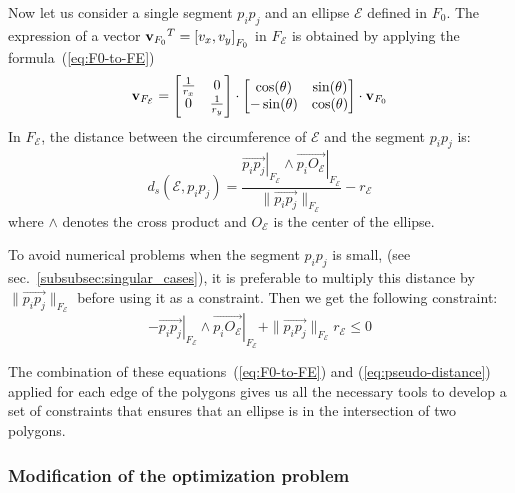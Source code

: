 Now let us consider a single segment $p_i p_j$ and an ellipse $\mathcal{E}$ defined in $F_0$.
The expression of a vector ${{\bf v}_{F_0}}^T = {[v_x, v_y]}_{F_0}$ in $F_\mathcal{E}$ is obtained by applying the formula~(\ref{eq:F0-to-FE})
\begin{equation}
{\bf v}_{F_\mathcal{E}} =
\begin{bmatrix}
\frac{1}{r_x} & 0 \\
0 & \frac{1}{r_y}
\end{bmatrix}
\cdot \begin{bmatrix}
\cos(\theta) & \sin(\theta) \\
-\sin(\theta) & \cos(\theta)
\end{bmatrix}
\cdot {\bf v}_{F_0}
\label{eq:F0-to-FE}
\end{equation}
In $F_\mathcal{E}$, the distance between the circumference of $\mathcal{E}$ and the segment $p_i p_j$ is:
\begin{equation}
	d_s(\mathcal{E}, p_i p_j) = \frac{{\left.\overrightarrow{p_i p_j}\right|}_{F_\mathcal{E}} \wedge {\left.\overrightarrow{p_i O_\mathcal{E}}\right|}_{F_\mathcal{E} } }{\| \overrightarrow{p_i p_j}\|_{F_\mathcal{E} } }-r_{\mathcal{E}}
\end{equation}
where $\wedge$ denotes the cross product and $O_{\mathcal{E}}$ is the center of the ellipse.

To avoid numerical problems when the segment $p_i p_j$ is small, (see sec.~\ref{subsubsec:singular_cases}), it is preferable to multiply this distance by $\| \overrightarrow{p_i p_j}\|_{F_\mathcal{E}}$ before using it as a constraint.
Then we get the following constraint:
\begin{equation}
	-{\left.\overrightarrow{p_i p_j}\right|}_{F_\mathcal{E}} \wedge {\left.\overrightarrow{p_i O_\mathcal{E}}\right|}_{F_\mathcal{E}}+\| \overrightarrow{p_i p_j}\|_{F_\mathcal{E}} r_{\mathcal{E}} \leq 0
\label{eq:pseudo-distance}
\end{equation}

The combination of these equations~(\ref{eq:F0-to-FE}) and (\ref{eq:pseudo-distance}) applied for each edge of the polygons gives us all the necessary tools to develop a set of constraints that ensures that an ellipse is in the intersection of two polygons.



\subsubsection{Modification of the optimization problem}

